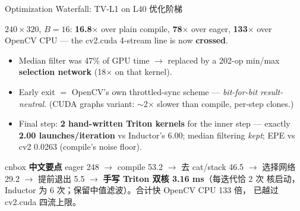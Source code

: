 \documentclass[aspectratio=169,10pt]{beamer}
\newcommand{\zh}[1]{{\zhfont #1}}
\newenvironment{cn}{%
  \begin{beamercolorbox}[rounded=true,sep=4pt,wd=\textwidth]{cnbox}\zhfont\footnotesize
  {\color{cblue!70!black}\textbf{中文要点}}\quad}%
  {\end{beamercolorbox}}
\newcommand{\wfbar}[4]{%
  \pgfmathsetmacro{\bh}{log10(#2)*1.05}%
  \fill[#3,rounded corners=1.5pt] (#1-0.42,0) rectangle (#1+0.42,\bh);
  \node[above] at (#1,\bh) {\scriptsize\textbf{#2}};
  \node[below,align=center,font=\tiny] at (#1,-0.08) {#4};}
\begin{document}
\begin{frame}{Optimization Waterfall: TV-L1 on L40 \zh{优化阶梯}}
  \centering
  \par
  {\footnotesize $240{\times}320$, $B{=}16$: \textbf{16.8$\times$} over plain
   compile, \textbf{78$\times$} over eager, \textbf{133$\times$} over OpenCV
   CPU --- the cv2.cuda 4-stream line is now \textbf{crossed}.}
  \begin{itemize}\itemsep0pt\scriptsize
    \item Median filter was 47\% of GPU time $\to$ replaced by a 202-op
      min/max \textbf{selection network} (18$\times$ on that kernel).
    \item Early exit $=$ OpenCV's own throttled-sync scheme ---
      \emph{bit-for-bit result-neutral}. (CUDA graphs variant:
      $\sim$2$\times$ slower than compile, per-step clones.)
    \item Final step: \textbf{2 hand-written Triton kernels} for the inner
      step --- exactly \textbf{2.00 launches/iteration} vs Inductor's 6.00;
      median filtering \emph{kept}; EPE vs cv2 0.0263 (compile's noise floor).
  \end{itemize}
  \vfill
  \begin{cn}
    eager 248 $\to$ compile 53.2 $\to$ 去 cat/stack 46.5 $\to$ 选择网络 29.2
    $\to$ 提前退出 5.5 $\to$ \textbf{手写 Triton 双核 3.16 ms}（每迭代恰 2 次
    核启动，Inductor 为 6 次；保留中值滤波）。合计快 OpenCV CPU 133 倍，
    已越过 cv2.cuda 四流上限。
  \end{cn}
\end{frame}
\end{document}
